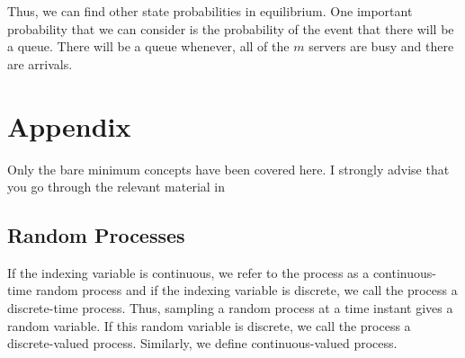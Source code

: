 \documentclass[11pt, a4paper]{report}
\begin{document}
Thus, we can find other state probabilities in equilibrium. One important probability that we can consider is the probability of the event that there will be a queue. There will be a queue whenever, all of the $m$ servers are busy and there are arrivals.

\chapter{Appendix}
Only the bare minimum concepts have been covered here. I strongly advise that you go through the relevant material in \cite{pishro2014introduction}
\section{Random Processes}
If the indexing variable is continuous, we refer to the process as a continuous-time random process and if the indexing variable is discrete, we call the process a discrete-time process. Thus, sampling a random process at a time instant gives a random variable. If this random variable is discrete, we call the process a discrete-valued process. Similarly, we define continuous-valued process. 



\end{document}
